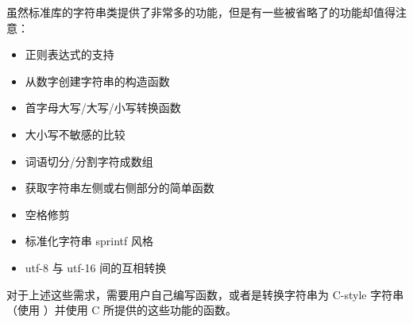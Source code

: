 \documentclass[../../LearnCpp.tex]{subfiles}
\begin{document}
虽然标准库的字符串类提供了非常多的功能，但是有一些被省略了的功能却值得注意：

\begin{itemize}
  \item 正则表达式的支持
  \item 从数字创建字符串的构造函数
  \item 首字母大写/大写/小写转换函数
  \item 大小写不敏感的比较
  \item 词语切分/分割字符成数组
  \item 获取字符串左侧或右侧部分的简单函数
  \item 空格修剪
  \item 标准化字符串 sprintf 风格
  \item utf-8 与 utf-16 间的互相转换
\end{itemize}

对于上述这些需求，需要用户自己编写函数，或者是转换字符串为 C-style 字符串（使用 ）并使用 C 所提供的这些功能的函数。
\end{document}
